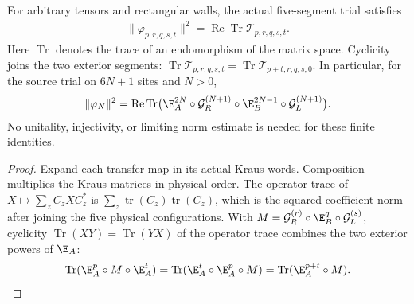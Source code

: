 \begin{lemma}
    \label{lem:uncle_trial_norm_transfer}
    \leanok
    For arbitrary tensors and rectangular walls, the actual five-segment
    trial satisfies
    \begin{align}
        \|\varphi_{p,r,q,s,t}\|^2=
        \operatorname{Re}\operatorname{Tr}\mathcal T_{p,r,q,s,t}.
        \label{eq:uncle_trial_norm_trace}
    \end{align}
    Here $\operatorname{Tr}$ denotes the trace of an endomorphism of the
    matrix space. Cyclicity joins the two exterior segments:
    $\operatorname{Tr}\mathcal T_{p,r,q,s,t}
        =\operatorname{Tr}\mathcal T_{p+t,r,q,s,0}$.
    In particular, for the source trial on $6N+1$ sites and $N>0$,
    \begin{align}
        \|\varphi_N\|^2=
        \operatorname{Re}\operatorname{Tr}
        \bigl(\E_A^{2N}\circ\mathcal G_R^{(N+1)}
        \circ\E_B^{2N-1}\circ\mathcal G_L^{(N+1)}\bigr).
        \label{eq:uncle_source_trial_norm_trace}
    \end{align}
    No unitality, injectivity, or limiting norm estimate is needed for
    these finite identities.
\end{lemma}
\begin{proof}
    \leanok
    Expand each transfer map in its actual Kraus words. Composition
    multiplies the Kraus matrices in physical order. The operator trace
    of $X\mapsto\sum_z C_zXC_z^*$ is
    $\sum_z\operatorname{tr}(C_z)\overline{\operatorname{tr}(C_z)}$,
    which is the squared coefficient norm after joining the five physical
    configurations. With
    $M=\mathcal G_R^{(r)}\circ\E_B^q\circ\mathcal G_L^{(s)}$, cyclicity
    $\operatorname{Tr}(XY)=\operatorname{Tr}(YX)$ of the operator trace
    combines the two exterior powers of $\E_A$:
    \begin{align}
        \operatorname{Tr}(\E_A^p\circ M\circ\E_A^t)
        =\operatorname{Tr}(\E_A^t\circ\E_A^p\circ M)
        =\operatorname{Tr}(\E_A^{p+t}\circ M).
        \label{eq:uncle_trial_transfer_join_exterior}
    \end{align}
\end{proof}

